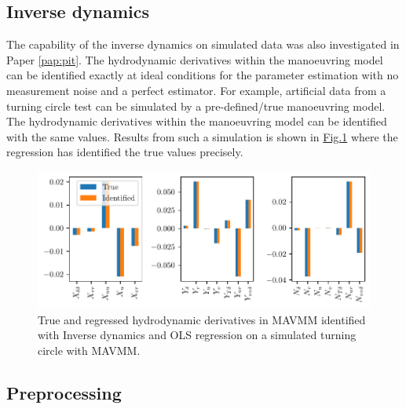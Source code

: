 \subsection{Inverse dynamics}
\label{\detokenize{06.40_results_inverse_dynamics:inverse-dynamics}}\label{\detokenize{06.40_results_inverse_dynamics::doc}}
The capability of the inverse dynamics on simulated data was also investigated in Paper \ref{pap:pit}. The hydrodynamic derivatives within the manoeuvring model can be identified exactly at ideal conditions for the parameter estimation with no measurement noise and a perfect estimator. For example, artificial data from a turning circle test can be simulated by a pre-defined/true manoeuvring model. The hydrodynamic derivatives within the manoeuvring model can be identified with the same values. Results from such a simulation is shown in \hyperref[\detokenize{06.40_results_inverse_dynamics:fig-bar-parameters}]{Fig.\@ \ref{\detokenize{06.40_results_inverse_dynamics:fig-bar-parameters}}} where the regression has identified the true values precisely.
\begin{figure}[!htb]
\centering
\includegraphics{kappa/images/5.pdf}
\caption{True and regressed hydrodynamic derivatives in MAVMM identified with Inverse dynamics and OLS regression on a simulated turning circle with MAVMM.}\label{\detokenize{06.40_results_inverse_dynamics:fig-bar-parameters}}\end{figure}


\subsection{Preprocessing}
\label{\detokenize{06.31_results_noise:preprocessing}}\label{\detokenize{06.31_results_noise::doc}}

